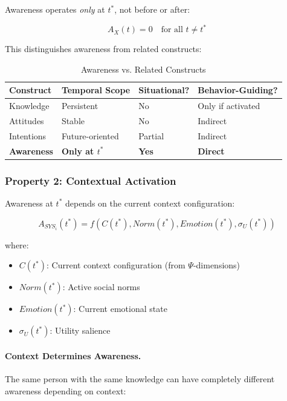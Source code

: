 Awareness operates \emph{only} at $t^*$, not before or after:

\begin{equation}
A_X(t) = 0 \quad \text{for all } t \neq t^*
\end{equation}

This distinguishes awareness from related constructs:

\begin{table}[htbp]
\centering
\caption{Awareness vs. Related Constructs}
\label{tab:awareness-vs-constructs}
\renewcommand{\arraystretch}{1.3}
\begin{tabular}{@{}llll@{}}
\toprule
\textbf{Construct} & \textbf{Temporal Scope} & \textbf{Situational?} & \textbf{Behavior-Guiding?} \\
\midrule
Knowledge & Persistent & No & Only if activated \\
Attitudes & Stable & No & Indirect \\
Intentions & Future-oriented & Partial & Indirect \\
\textbf{Awareness} & \textbf{Only at $t^*$} & \textbf{Yes} & \textbf{Direct} \\
\bottomrule
\end{tabular}
\end{table}

\subsubsection{Property 2: Contextual Activation}

Awareness at $t^*$ depends on the current context configuration:

\begin{equation}
A_{SYS_i}(t^*) = f(C(t^*), Norm(t^*), Emotion(t^*), \sigma_U(t^*))
\end{equation}

where:
\begin{itemize}
\item $C(t^*)$: Current context configuration (from $\Psi$-dimensions)
\item $Norm(t^*)$: Active social norms
\item $Emotion(t^*)$: Current emotional state
\item $\sigma_U(t^*)$: Utility salience
\end{itemize}

\paragraph{Context Determines Awareness.}
The same person with the same knowledge can have completely different
awareness depending on context:

